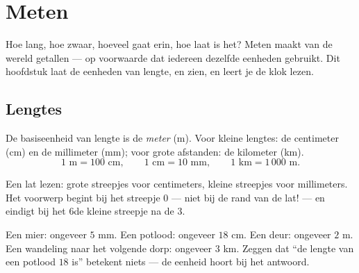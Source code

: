 \chapter{Meten}\label{ch:g3:measure}

Hoe lang, hoe zwaar, hoeveel gaat erin, hoe laat is het? Meten maakt van
de wereld getallen --- op voorwaarde dat iedereen dezelfde eenheden
gebruikt. Dit hoofdstuk laat de eenheden van lengte,  en  zien,
en leert je de klok lezen.

\section{Lengtes}

\begin{definition}\label{def:g3:measure:length}
De basiseenheid van lengte is de \emph{meter} (m). Voor kleine lengtes:
de centimeter (cm) en de millimeter (mm); voor grote afstanden: de
kilometer (km).
\[
1 \text{ m} = 100 \text{ cm}, \qquad
1 \text{ cm} = 10 \text{ mm}, \qquad
1 \text{ km} = 1\,000 \text{ m}.
\]
\end{definition}

\begin{omfigure}

{\small Een lat lezen: grote streepjes voor centimeters, kleine
streepjes voor millimeters. Het voorwerp begint bij het streepje $0$ ---
niet bij de rand van de lat! --- en eindigt bij het $6$de kleine streepje
na de $3$.}
\end{omfigure}

\begin{example}\label{ex:g3:measure:choose}
Een mier: ongeveer $5$ mm. Een potlood: ongeveer $18$ cm. Een deur:
ongeveer $2$ m. Een wandeling naar het volgende dorp: ongeveer $3$ km.
Zeggen dat ``de lengte van een potlood $18$ is'' betekent niets --- de
eenheid hoort bij het antwoord.
\end{example}

